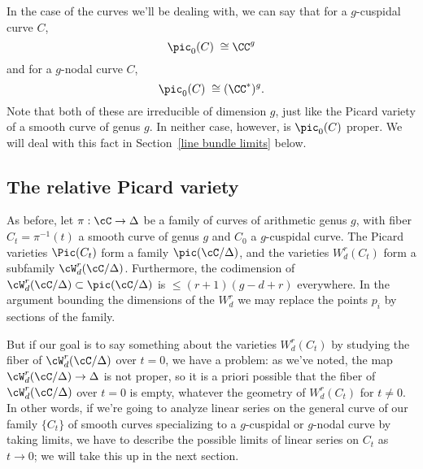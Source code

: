 In the case of the curves we'll be dealing with, we can say that for a $g$-cuspidal curve $C$,
$$
\pic_0(C) \; \cong \CC^g
$$
and for a $g$-nodal curve $C$, 
$$
\pic_0(C) \; \cong (\CC^*)^g.
$$
Note that both of these are irreducible of dimension $g$, just like the Picard variety of a smooth curve of genus $g$. In neither case, however, is $\pic_0(C)$ proper. We will deal with this fact in Section~\ref{line bundle limits} below.

\subsection{The relative Picard variety}

As before, let $\pi : \cC \to \Delta$ be a family of curves of arithmetic genus $g$, with fiber $C_t = \pi^{-1}(t)$ a smooth curve of genus $g$ and $C_0$ a $g$-cuspidal curve. The Picard varieties $\Pic(C_t)$ form a family $\pic(\cC/\Delta)$, and the varieties $W^r_d(C_t)$ form a subfamily $\cW^r_d(\cC/\Delta)$. Furthermore, the codimension of $\cW^r_d(\cC/\Delta) \subset \pic(\cC/\Delta)$ is $\leq (r+1)(g-d+r)$ everywhere. In the argument bounding  the dimensions of the $W^r_d$
we may replace the points $p_i$ by sections of the family.

But if our goal is to say something about the varieties $W^r_d(C_t)$ by studying the fiber of $\cW^r_d(\cC/\Delta)$ over $t=0$, we have a problem: as we've noted, the map $\cW^r_d(\cC/\Delta) \to \Delta$ is not proper, so it is a priori possible that the fiber of $\cW^r_d(\cC/\Delta)$ over $t=0$ is empty, whatever the geometry of $W^r_d(C_t)$ for $t \neq 0$. In other words,  if we're going to analyze linear series on the general curve of our family $\{C_t\}$ of smooth curves specializing to a $g$-cuspidal or $g$-nodal curve by taking limits, we have to describe the possible limits of linear series on $C_t$ as $t\to 0$; we will take this up in the next section.

